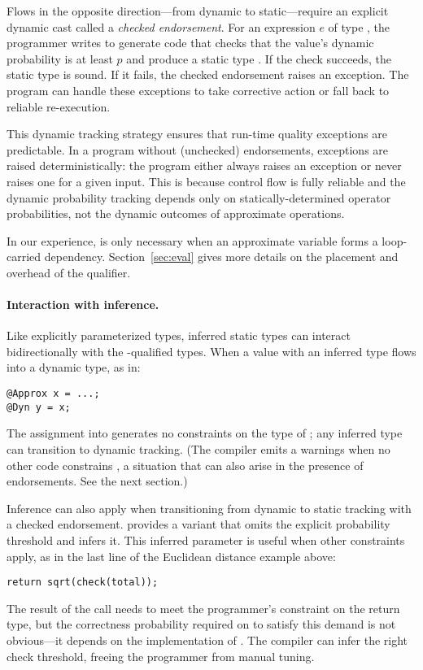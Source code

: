 {Flows in the opposite direction---from dynamic to static---require an explicit
dynamic cast called a \emph{checked endorsement}.
For an expression $e$ of type , the programmer writes
 to generate code that checks that the value's
dynamic probability is at least $p$ and produce a static type
.
If the check succeeds, the static type is sound.
If it fails, the checked endorsement raises an exception.
The program can handle these exceptions to take corrective action or fall back
to reliable re-execution.

This dynamic tracking strategy ensures that run-time quality exceptions are predictable.
In a program without (unchecked) endorsements, exceptions are raised
deterministically: the program either always raises an exception or never
raises one for a given input.
This is because control flow is fully reliable and the dynamic probability
tracking depends only on statically-determined operator probabilities, not the
dynamic outcomes of approximate operations.

In our experience,  is only necessary when an approximate variable
forms a loop-carried dependency.
Section~\ref{sec:eval} gives more details on the placement and overhead of the
 qualifier.

\paragraph{Interaction with inference.}
Like explicitly parameterized types, inferred static types can interact bidirectionally
with the -qualified types.
When a value with an inferred type flows into a dynamic type, as in:
%
\begin{lstlisting}
@Approx x = ...;
@Dyn y = x;
\end{lstlisting}
%
The assignment into  generates no constraints on the type of ;
any inferred type can transition to dynamic tracking.
(The compiler emits a warnings when no other code constrains
, a situation that can also arise in the presence of endorsements. See
the next section.)

Inference can also apply when transitioning from dynamic to static tracking
with a checked endorsement.
\lang provides a  variant that omits the explicit probability
threshold and infers it.
This inferred parameter is useful when other constraints apply, as in the
last line of the Euclidean distance example above:
%
\begin{lstlisting}
return sqrt(check(total));
\end{lstlisting}
%
The result of the  call needs to meet the programmer's
 constraint on the return type, but the correctness
probability required on  to satisfy this demand is not
obvious---it depends on the implementation of .
The compiler can infer the right check threshold, freeing the programmer from
manual tuning.

}
